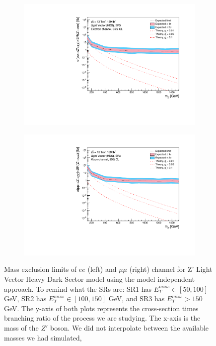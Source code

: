 \documentclass[12pt, a4paper]{book}
\begin{document}
\begin{figure}[!ht]
\begin{subfigure}[b]{0.49\textwidth}
      \includegraphics[width=1\textwidth]{Limits/Model_independent/150/LV_HDS/mass_exclusion_ee.pdf}
   \end{subfigure}
   \hfill
   \begin{subfigure}[b]{0.49\textwidth}
      \centering
      \includegraphics[width=1\textwidth]{Limits/Model_independent/150/LV_HDS/mass_exclusion_uu.pdf}
   \end{subfigure}
   \caption[Expected mass exclusion limits results for LV HDS model on $ee$ and $\mu\mu$ channel using the model independent approach]{Mass exclusion limits of $ee$ (left) and $\mu\mu$ (right) channel for Z' Light Vector Heavy Dark Sector model using the model independent approach. To remind what the SRs are: SR1 has $E_T^{miss}\in[50, 100]$ GeV, SR2 has $E_T^{miss}\in[100, 150]$ GeV, and SR3 has $E_T^{miss}>150$ GeV. The y-axis of both plots represents the cross-section times branching ratio of the process we are studying. The x-axis is the mass of the $Z'$ boson. We did not interpolate between the available masses we had simulated, 
}
\end{figure}
\end{document}
